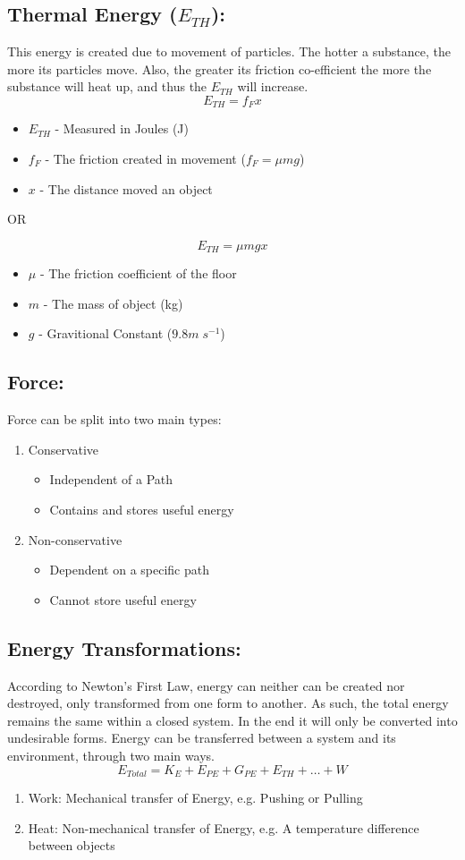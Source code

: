 \documentclass[a5paper]{report}
\begin{document}
	\subsection*{Thermal Energy ($E_{TH}$):}
	This energy is created due to movement of particles. The hotter a substance, the more its particles move. Also, the greater its friction co-efficient the more the substance will heat up, and thus the $E_{TH}$ will increase.
	$$E_{TH}=f_{F}x$$
	\begin{itemize}
		\item $E_{TH}$ - Measured in Joules (J)
		\item $f_{F}$ - The friction created in movement ($f_{F}=\mu mg$)
		\item $x$ - The distance moved an object
	\end{itemize}
	\begin{center}
		OR
	\end{center}
	$$E_{TH}=\mu mgx$$
	\begin{itemize}
		\item $\mu$ - The friction coefficient of the floor
		\item $m$ - The mass of object (kg)
		\item $g$ - Gravitional Constant ($9.8m\;s^{-1}$)
	\end{itemize}
	\subsection*{Force:}
	Force can be split into two main types:
	\begin{enumerate}
		\item Conservative
		\begin{itemize}
			\item Independent of a Path
			\item Contains and stores useful energy
		\end{itemize}
		\item Non-conservative
		\begin{itemize}
			\item Dependent on a specific path
			\item Cannot store useful energy
		\end{itemize}
	\end{enumerate}
	\subsection*{Energy Transformations:}
	According to Newton's First Law, energy can neither can be created nor destroyed, only transformed from one form to another. As such, the total energy remains the same within a closed system. In the end it will only be converted into undesirable forms. Energy can be transferred between a system and its environment, through two main ways.
	$$E_{Total}=K_{E}+E_{PE}+G_{PE}+E_{TH}+\ldots +W$$
	\begin{enumerate}
		\item Work: Mechanical transfer of Energy, e.g. Pushing or Pulling
		\item Heat: Non-mechanical transfer of Energy, e.g. A temperature difference between objects
	\end{enumerate}
\end{document}
